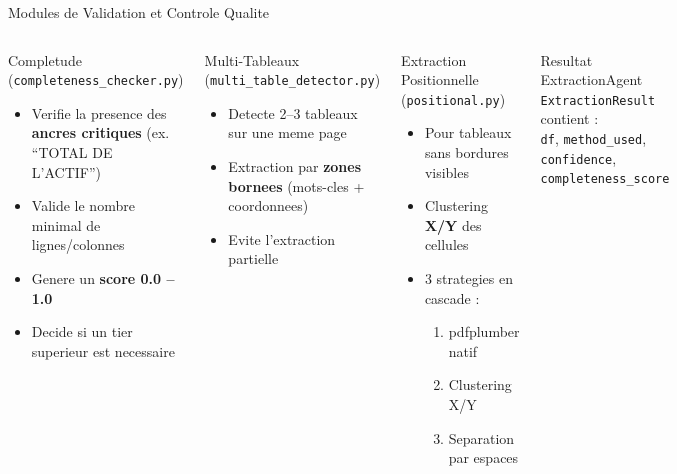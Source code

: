 \documentclass[aspectratio=169, 10pt]{beamer}
\begin{document}

\begin{frame}{Modules de Validation et Controle Qualite}
  \begin{columns}[T]
      \begin{block}{Completude (\texttt{completeness\_checker.py})}
        \begin{itemize}\small
          \item Verifie la presence des \textbf{ancres critiques}
                (ex. ``TOTAL DE L'ACTIF'')
          \item Valide le nombre minimal de lignes/colonnes
          \item Genere un \textbf{score 0.0 -- 1.0}
          \item Decide si un tier superieur est necessaire
        \end{itemize}
      \end{block}

      \begin{block}{Multi-Tableaux (\texttt{multi\_table\_detector.py})}
        \begin{itemize}\small
          \item Detecte 2--3 tableaux sur une meme page
          \item Extraction par \textbf{zones bornees}
                (mots-cles + coordonnees)
          \item Evite l'extraction partielle
        \end{itemize}
      \end{block}

      \begin{block}{Extraction Positionnelle (\texttt{positional.py})}
        \begin{itemize}\small
          \item Pour tableaux sans bordures visibles
          \item Clustering \textbf{X/Y} des cellules
          \item 3 strategies en cascade :
                \begin{enumerate}\scriptsize
                  \item pdfplumber natif
                  \item Clustering X/Y
                  \item Separation par espaces
                \end{enumerate}
        \end{itemize}
      \end{block}

      \begin{alertblock}{Resultat ExtractionAgent}
        \texttt{ExtractionResult} contient :\\[3pt]
        \texttt{df}, \texttt{method\_used},\\
        \texttt{confidence}, \texttt{completeness\_score}
      \end{alertblock}
  \end{columns}
\end{frame}
\end{document}
